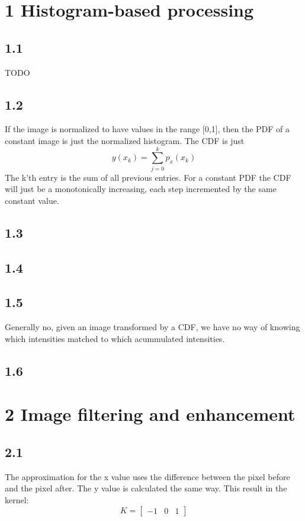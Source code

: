 \documentclass[11pt]{report}
\begin{document}
\section{1 Histogram-based processing}
\subsection{1.1}
TODO
\subsection{1.2}
If the image is normalized to have values in the range [0,1], then the PDF of a constant image is just the normalized histogram. The CDF is just
$$
y(x_k) = \sum_{j=0}^{k}p_x(x_k)
$$
The k'th entry is the sum of all previous entries.
For a constant PDF the CDF will just be a monotonically increasing, each step incremented by the same constant value.
\subsection{1.3}


\subsection{1.4}
\subsection{1.5}
Generally no, given an image transformed by a CDF, we have no way of knowing which intensities matched to which acummulated intensities.

\subsection{1.6}





\section{2 Image filtering and enhancement}

\subsection{2.1}
The approximation for the x value uses the difference between the pixel before and the pixel after. The y value is calculated the same way. This result in the kernel:
$$
K =
\begin{bmatrix}
  -1 & 0 & 1
 \end{bmatrix}
$$
\end{document}
